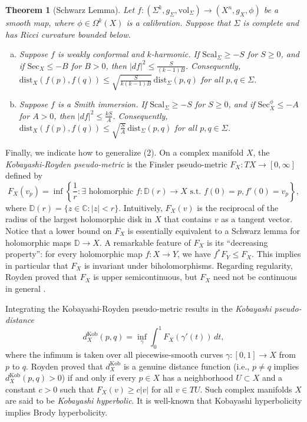 \documentclass[11pt]{article}
\newcommand{\C}{\mathbb{C}}
\newcommand{\vol}{\mathrm{vol}}
\newtheorem{thm}{Theorem}[section]
\theoremstyle{definition}
\numberwithin{equation}{section}
\begin{document}
\begin{thm}[Schwarz Lemma] \label{thm:Main3} Let $f \colon (\Sigma^k, g_\Sigma, \vol_\Sigma) \to (X^n, g_X, \phi)$ be a smooth map, where $\phi \in \Omega^k(X)$ is a calibration.  Suppose that $\Sigma$ is complete and has Ricci curvature bounded below.
\begin{enumerate}[(a)]
\item Suppose $f$ is weakly conformal and $k$-harmonic.  If $\mathrm{Scal}_\Sigma \geq -S$ for $S \geq 0$, and if $\mathrm{Sec}_X \leq -B$ for $B > 0$, then $|df|^2 \leq \frac{S}{(k-1)B}$.  Consequently, $\mathrm{dist}_X(f(p), f(q)) \leq \sqrt{ \frac{S}{k(k-1)B} }\,\mathrm{dist}_\Sigma(p,q)$ for all $p,q \in \Sigma$.
\item Suppose $f$ is a Smith immersion.  If $\mathrm{Scal}_\Sigma \geq -S$ for $S \geq 0$, and if $\mathrm{Sec}^\phi_X \leq -A$ for $A > 0$, then $|df|^2 \leq \frac{kS}{A}$.   Consequently, $\mathrm{dist}_X(f(p), f(q)) \leq \sqrt{ \frac{S}{A}}\,\mathrm{dist}_\Sigma(p,q)$ for all $p,q \in \Sigma$.
\end{enumerate}
\end{thm}

Finally, we indicate how to generalize (2).  On a complex manifold $X$, the \emph{Kobayashi-Royden pseudo-metric} is the Finsler pseudo-metric $F_X \colon TX \to [0, \infty]$ defined by
\begin{equation} \label{eq:KRPM}
F_X(v_p) = \inf\left\{ \frac{1}{r} \colon \exists \text{ holomorphic }f \colon \mathbb{D}(r) \to X \text{ s.t. }f(0) = p, f'(0) = v_p \right\}\!,
\end{equation}
where $\mathbb{D}(r) = \{z \in \C \colon |z| < r\}$.  Intuitively, $F_X(v)$ is the reciprocal of the radius of the largest holomorphic disk in $X$ that contains $v$ as a tangent vector.  Notice that a lower bound on $F_X$ is essentially equivalent to a Schwarz lemma for holomorphic maps $\mathbb{D} \to X$.  A remarkable feature of $F_X$ is its ``decreasing property”: for every holomorphic map $f \colon X \to Y$, we have $f^*F_Y \leq F_X$.  This implies in particular that $F_X$ is invariant under biholomorphisms.  Regarding regularity, Royden proved \cite{royden2006remarks} that $F_X$ is upper semicontinuous, but $F_X$ need not be continuous in general \cite[Example 3.5.37]{kobayashi2013hyperbolic}.

\indent Integrating the Kobayashi-Royden pseudo-metric results in the \emph{Kobayashi pseudo-distance}
\begin{equation} \label{eq:KobDist}
d_X^{\mathrm{Kob}}(p,q) = \inf_\gamma \int_0^1 F_X(\gamma'(t))\,dt,
\end{equation}
where the infimum is taken over all piecewise-smooth curves $\gamma \colon [0,1] \to X$ from $p$ to $q$.  Royden proved that $d_X^{\mathrm{Kob}}$ is a genuine distance function (i.e., $p \neq q$ implies $d_X^{\mathrm{Kob}}(p,q) > 0$) if and only if every $p \in X$ has a neighborhood $U \subset X$ and a constant $c > 0$ such that $F_X(v) \geq c |v|$ for all $v \in TU$.  Such complex manifolds $X$ are said to be \emph{Kobayashi hyperbolic}.  It is well-known that Kobayashi hyperbolicity implies Brody hyperbolicity.
\end{document}
